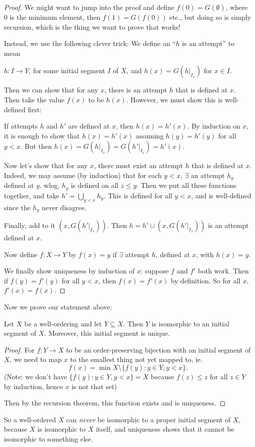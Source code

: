 \documentclass[a4paper]{article}
\begin{document}
\begin{proof}
  We might want to jump into the proof and define $f(0) = G(\emptyset)$, where $0$ is the minimum element, then $f(1) = G(f(0))$ etc., but doing so is simply recursion, which is the thing we want to prove that works!

  Instead, we use the following clever trick: We define an ``$h$ is an attempt'' to mean
  \begin{center}
    $h: I \to Y$, for some initial segment $I$ of $X$, and $h(x) = G(h|_{I_x})$ for $x\in I$.
  \end{center}
  Then we can show that for any $x$, there is an attempt $h$ that is defined at $x$. Then take the value $f(x)$ to be $h(x)$. However, we must show this is well-defined first:

  If attempts $h$ and $h'$ are defined at $x$, then $h(x) = h'(x)$. By induction on $x$, it is enough to show that $h(x) = h'(x)$ assuming $h(y) = h'(y)$ for all $y < x$. But then $h(x) = G(h|_{I_x}) = G(h'|_{I_x}) = h'(x)$.

  Now let's show that for any $x$, there must exist an attempt $h$ that is defined at $x$. Indeed, we may assume (by induction) that for each $y < x$, $\exists$ an attempt $h_y$ defined at $y$. wlog, $h_y$ is defined on all $z \leq y$. Then we put all these functions together, and take $h' = \bigcup_{y < x} h_y$. This is defined for all $y < x$, and is well-defined since the $h_y$ never disagree.

  Finally, add to it $(x, G(h'|_{I_x}))$. Then $h = h'\cup (x, G(h'|_{I_x}))$ is an attempt defined at $x$.

  Now define $f:X\to Y$ by $f(x) = y$ if $\exists$ attempt $h$, defined at $x$, with $h(x) = y$.

  We finally show uniqueness by induction of $x$: suppose $f$ and $f'$ both work. Then if $f(y) = f'(y)$ for all $y < x$, then $f(x) = f'(x)$ by definition. So for all $x$, $f'(x) = f(x)$.
\end{proof}
Now we prove our statement above:
\begin{prop}
  Let $X$ be a well-ordering and let $Y\subseteq X$. Then $Y$ is isomorphic to an initial segment of $X$. Moreover, this initial segment is unique.
\end{prop}

\begin{proof}
  For $f: Y\to X$ to be an order-preserving bijection with an initial segment of $X$, we need to map $x$ to the smallest thing not yet mapped to, ie. 
  \[
    f(x) = \min X\setminus \{f(y): y\in Y, y < x\}.
  \]
  (Note: we don't have $\{f(y): y\in Y, y < x\} = X$ because $f(z) \leq z$ for all $z\in Y$ by induction, hence $x$ is not that set)

  Then by the recursion theorem, this function exists and is uniqueness.
\end{proof}
\note So a well-ordered $X$ can \emph{never} be isomorphic to a proper initial segment of $X$, because $X$ is isomorphic to $X$ itself, and uniqueness shows that it cannot be isomorphic to something else.
\end{document}
